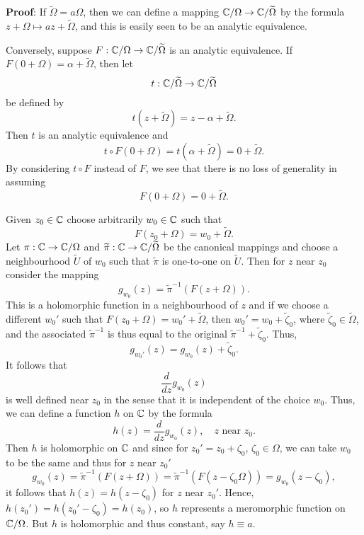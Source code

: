 \documentclass[a4paper,11pt]{article}
\begin{document}
\begin{mdframed}
  \textbf{Proof}: If $\widetilde{\Omega} = a\Omega$, then we can
  define a mapping ${\mathbb C} / \Omega \to {\mathbb C} / \widetilde{\Omega}$ by
  the formula $z + \Omega \mapsto az + \widetilde{\Omega}$, and this is
  easily seen to be an analytic equivalence.

  Conversely, suppose $F : {\mathbb C} / \Omega \to {\mathbb C} /
  \widetilde{\Omega}$ is an analytic equivalence.  If $F(0 + \Omega) =
  \alpha + \widetilde{\Omega}$, then let
  $$
  t : {\mathbb C} / \widetilde{\Omega} \to {\mathbb C} / \widetilde{\Omega}
  $$
  be defined by
  $$
  t(z + \widetilde{\Omega}) = z - \alpha + \widetilde{\Omega}.
  $$
  Then $t$ is an analytic equivalence and
  $$
  t \circ F(0 + \Omega) = t(\alpha + \widetilde{\Omega}) 
  = 0 + \widetilde{\Omega}.
  $$
  By considering $t \circ F$ instead of $F$, we see that there is no
  loss of generality in assuming
  $$
  F(0 + \Omega) = 0 + \widetilde{\Omega}.
  $$

  Given $z_0 \in {\mathbb C}$ choose arbitrarily $w_0 \in {\mathbb C}$ such that
  $$
  F(z_0 + \Omega) = w_0 + \widetilde{\Omega}.
  $$
  Let $\pi : {\mathbb C} \to {\mathbb C} / \Omega$ and $\widetilde{\pi} : {\mathbb C}
  \to {\mathbb C} / \widetilde{\Omega}$ be the canonical mappings and choose
  a neighbourhood $\widetilde{U}$ of $w_0$ such that $\widetilde{\pi}$
  is one-to-one on $\widetilde{U}$.  Then for $z$ near $z_0$ consider
  the mapping
  $$
  g_{w_0}(z) = \widetilde{\pi}^{-1}(F(z + \Omega)).
  $$
  This is a holomorphic function in a neighbourhood of $z$ and if we
  choose a different $w_0'$ such that $F(z_0 + \Omega) = w_0' +
  \widetilde{\Omega}$, then $w_0' = w_0 + \widetilde{\zeta}_0$, where
  $\widetilde{\zeta}_0 \in \widetilde{\Omega}$, and the associated
  $\widetilde{\pi}^{-1}$ is thus equal to the original
  $\widetilde{\pi}^{-1} + \widetilde{\zeta}_0$.  Thus,
  $$
  g_{w_0'}(z) = g_{w_0}(z) + \widetilde{\zeta}_0.
  $$
  It follows that
  $$
  \frac{d}{dz}g_{w_0}(z)
  $$
  is well defined near $z_0$ in the sense that it is independent of
  the choice $w_0$.  Thus, we can define a function $h$ on ${\mathbb C}$ by
  the formula
  $$
  h(z) = \frac{d}{dz} g_{w_0}(z),\quad z \text{ near } z_0.
  $$
  Then $h$ is holomorphic on ${\mathbb C}$ and since for $z_0' = z_0 +
  \zeta_0$, $\zeta_0 \in \Omega$, we can take $w_0$ to be the same and
  thus for $z$ near $z_0'$
  $$
  g_{w_0}(z) = \widetilde{\pi}^{-1}(F(z + \Omega))
  = \widetilde{\pi}^{-1}(F(z - \zeta_0 \Omega))
  = g_{w_0}(z - \zeta_0),
  $$
  it follows that $h(z) = h(z - \zeta_0)$ for $z$ near $z_0'$.  Hence,
  $h(z_0') = h(z_0' - \zeta_0) = h(z_0)$, so $h$ represents a
  meromorphic function on ${\mathbb C} / \Omega$.  But $h$ is holomorphic and
  thus constant, say $h \equiv a$.


\end{mdframed}
\end{document}
